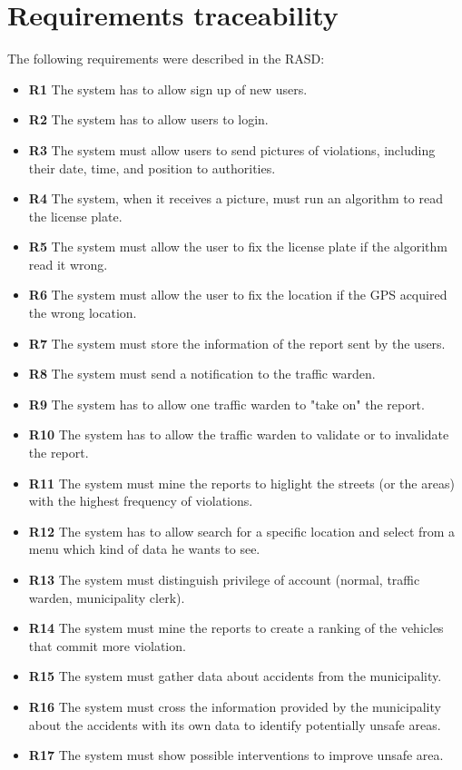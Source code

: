\documentclass{article}
\begin{document}
\section{Requirements traceability}
The following requirements were described in the RASD:
\begin{itemize}
\item	\textbf{R1} The system has to allow sign up of new users.
\item	\textbf{R2} The system has to allow users to login.
\item	\textbf{R3} The system must allow users to send pictures of violations, including their date, time, and position to authorities.
\item	\textbf{R4} The system, when it receives a picture, must run an algorithm to read the license plate.
\item	\textbf{R5} The system must allow the user to fix the license plate if the algorithm read it wrong.
\item	\textbf{R6} The system must allow the user to fix the location if the GPS acquired the wrong location.
\item	\textbf{R7} The system must store the information of the report sent by the users.
\item	\textbf{R8} The system must send a notification to the traffic warden.
\item	\textbf{R9} The system has to allow one traffic warden to "take on" the report.
\item	\textbf{R10} The system has to allow the traffic warden to validate or to invalidate the report.
\item	\textbf{R11} The system must mine the reports to higlight the streets (or the areas) with the highest frequency of violations.
\item	\textbf{R12} The system has to allow search for a specific location and select from a menu which kind of data he wants to see.
\item	\textbf{R13} The system must distinguish privilege of account (normal, traffic warden, municipality clerk).
\item	\textbf{R14} The system must mine the reports to create a ranking of the vehicles that commit more violation.
\item	\textbf{R15} The system must gather data about accidents from the municipality.
\item	\textbf{R16} The system must cross the information provided by the municipality about the accidents with its own data to identify potentially unsafe areas.
\item	\textbf{R17} The system must show possible interventions to improve unsafe area.
\end{itemize}
\end{document}
